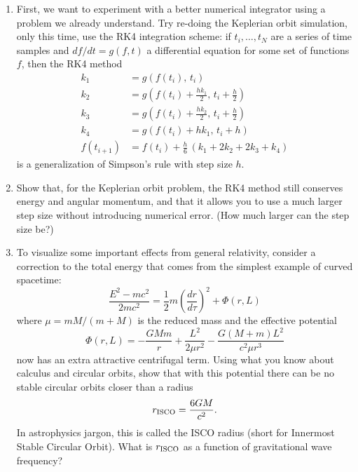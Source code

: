 \documentclass[11pt]{article}
\begin{document}
\begin{enumerate}

\item First, we want to experiment with a better numerical integrator using a problem we already understand. Try re-doing the Keplerian orbit simulation, only this time, use the RK4 integration scheme: if $t_i, \dots, t_N$ are a series of time samples and $df/dt = g(f, t)$ a differential equation for some set of functions $f$, then the RK4 method
\begin{align*}
k_1 &= g(f(t_i), \, t_i) \\
k_2 &= g\left(f(t_i) + \frac{hk_1}{2}, \, t_i + \frac{h}{2}\right) \\
k_3 &= g\left(f(t_i) + \frac{hk_2}{2}, \, t_i + \frac{h}{2}\right) \\
k_4 &= g(f(t_i) + hk_1, \, t_i + h) \\
f(t_{i+1}) &= f(t_i) + \frac{h}{6}\,\left(k_1 + 2k_2 + 2k_3 + k_4\right)
\end{align*}
is a generalization of Simpson's rule with step size $h$.

\item Show that, for the Keplerian orbit problem, the RK4 method still conserves energy and angular momentum, and that it allows you to use a much larger step size without introducing numerical error. (How much larger can the step size be?)

\item To visualize some important effects from general relativity, consider a correction to the total energy that comes from the simplest example of curved spacetime:
\begin{equation}
\frac{E^2 - mc^2}{2mc^2} = \frac{1}{2}m\left(\frac{dr}{d\tau}\right)^2 + \Phi(r, L)
\end{equation}
where $\mu = mM/(m + M)$ is the reduced mass and the effective potential
\begin{equation}\label{eq:potential}
\Phi(r, L) = -\frac{GMm}{r} + \frac{L^2}{2\mu r^2} - \frac{G(M + m)L^2}{c^2\mu r^3}
\end{equation}
now has an extra attractive centrifugal term. Using what you know about calculus and circular orbits, show that with this potential there can be no stable circular orbits closer than a radius
\begin{equation}\label{eq:ISCO}
r_{\rm ISCO} = \frac{6GM}{c^2}.
\end{equation}
In astrophysics jargon, this is called the ISCO radius (short for Innermost Stable Circular Orbit). What is $r_{\rm ISCO}$ as a function of gravitational wave frequency?


\end{enumerate}
\end{document}
